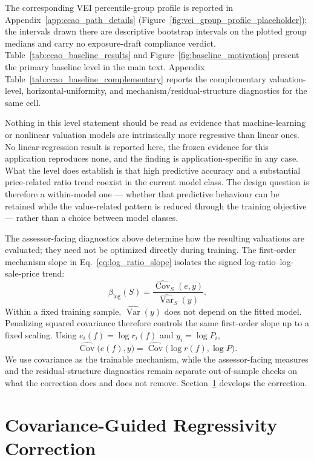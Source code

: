 \documentclass[10pt]{article}
\theoremstyle{definition}
\newcommand{\1}{\mathbf{1}}
\begin{document}
The corresponding VEI percentile-group profile is reported in Appendix~\ref{app:ccao_path_details} (Figure~\ref{fig:vei_group_profile_placeholder}); the intervals drawn there are descriptive bootstrap intervals on the plotted group medians and carry no exposure-draft compliance verdict.
Table~\ref{tab:ccao_baseline_results} and Figure~\ref{fig:baseline_motivation} present the primary baseline level in the main text. Appendix Table~\ref{tab:ccao_baseline_complementary} reports the complementary valuation-level, horizontal-uniformity, and mechanism/residual-structure diagnostics for the same cell.


Nothing in this level statement should be read as evidence that machine-learning or nonlinear valuation models are intrinsically more regressive than linear ones. No linear-regression result is reported here, the frozen evidence for this application reproduces none, and the finding is application-specific in any case. What the level does establish is that high predictive accuracy and a substantial price-related ratio trend coexist in the current model class. The design question is therefore a within-model one --- whether that predictive behaviour can be retained while the value-related pattern is reduced through the training objective --- rather than a choice between model classes.


{The assessor-facing diagnostics above determine how the resulting valuations are evaluated; they need not be optimized directly during training. The first-order mechanism slope in Eq.~\eqref{eq:log_ratio_slope} isolates the signed log-ratio--log-sale-price trend:
\[
\beta_{\log}(S)
=
\frac{\widehat{\operatorname{Cov}}_S(e,y)}
{\widehat{\operatorname{Var}}_S(y)}.
\]
Within a fixed training sample, $\widehat{\operatorname{Var}}(y)$ does not depend on the fitted model. Penalizing squared covariance therefore controls the same first-order slope up to a fixed scaling. Using $e_i(f)=\log r_i(f)$ and $y_i=\log P_i$,
\begin{equation}
\label{eq:training_covariance_bridge}
\widehat{\operatorname{Cov}}\bigl(e(f),y\bigr)
=
\widehat{\operatorname{Cov}}\bigl(\log r(f),\log P\bigr).
\end{equation}
We use covariance as the trainable mechanism, while the assessor-facing measures and the residual-structure diagnostics remain separate out-of-sample checks on what the correction does and does not remove. Section~\ref{sec:method} develops the correction.}


\section{Covariance-Guided Regressivity Correction}
\label{sec:method}
\end{document}
